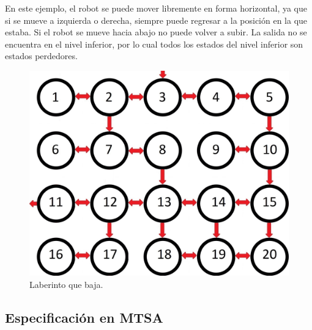 En este ejemplo, el robot se puede mover libremente en forma horizontal, ya que si se mueve a izquierda o derecha, siempre puede regresar a la posición en la que estaba. 
Si el robot se mueve hacia abajo no puede volver a subir. La salida no se encuentra en el nivel inferior, por lo cual todos los estados del nivel inferior son estados perdedores.

\begin{figure}[H]
	\centering
		\includegraphics[width=1.0\textwidth]{Imagenes/Laberintos/down.jpg}
	\caption{Laberinto que baja.}
	\label{fig:down}
\end{figure}

\subsection{Especificación en MTSA}

